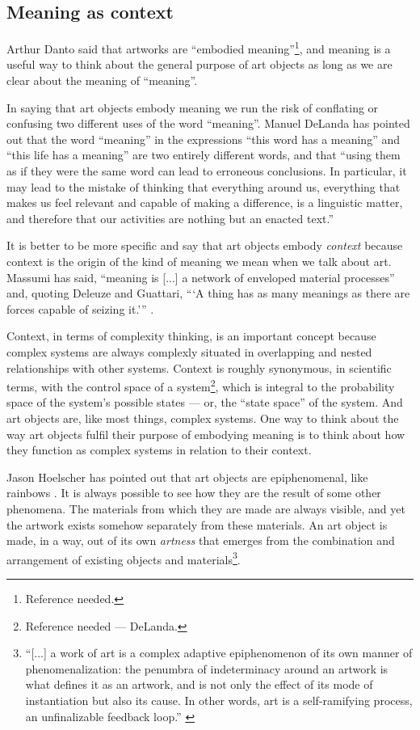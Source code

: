 \documentclass[letterpaper]{article}
\begin{document}
    \subsection{Meaning as context}

    Arthur Danto said that artworks are “embodied meaning”\footnote{
        Reference needed.
    }, and meaning is a useful way to think about the general purpose of art objects as long as we are clear about the meaning of “meaning”.
    
    In saying that art objects embody meaning we run the risk of conflating or confusing two different uses of the word “meaning”. Manuel DeLanda has pointed out that the word “meaning” in the expressions “this word has a meaning” and “this life has a meaning” are two entirely different words, and that “using them as if they were the same word can lead to erroneous conclusions. In particular, it may lead to the mistake of thinking that everything around us, everything that makes us feel relevant and capable of making a difference, is a linguistic matter, and therefore that our activities are nothing but an enacted text.” \citep[pp.40-41]{DeLandaCsltyAndMnng2018}
    
    It is better to be more specific and say that art objects embody \emph{context} because context is the origin of the kind of meaning we mean when we talk about art. Massumi has said, “meaning is [...] a network of enveloped material processes” and, quoting Deleuze and Guattari, “‘A thing has as many meanings as there are forces capable of seizing it.’” \citep[p.10]{MassumiAUsrsGdTCptlsmAndSchzphrn1992}.

    Context, in terms of complexity thinking, is an important concept because complex systems are always complexly situated in overlapping and nested relationships with other systems. Context is roughly synonymous, in scientific terms, with the control space of a system\footnote{
        Reference needed — DeLanda.
    }, which is integral to the probability space of the system's possible states — or, the “state space” of the system. And art objects are, like most things, complex systems. One way to think about the way art objects fulfil their purpose of embodying meaning is to think about how they function as complex systems in relation to their context.
    
    Jason Hoelscher has pointed out that art objects are epiphenomenal, like rainbows \citep[p.17]{HoelscherArtAsInfrmtn2021}. It is always possible to see how they are the result of some other phenomena. The materials from which they are made are always visible, and yet the artwork exists somehow separately from these materials. An art object is made, in a way, out of its own \emph{artness} that emerges from the combination and arrangement of existing objects and materials\footnote{
        “[...] a work of art is a complex adaptive epiphenomenon of its own manner of phenomenalization: the penumbra of indeterminacy around an artwork is what defines it as an artwork, and is not only the effect of its mode of instantiation but also its cause. In other words, art is a self-ramifying process, an unfinalizable feedback loop.” \citep[p.2]{HoelscherThPtcsOfPhsSpc2014}
    }.
    
\end{document}
